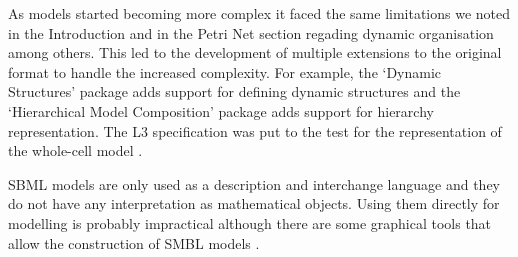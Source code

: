 As models started becoming more complex it faced the same limitations we noted
in the Introduction and in the Petri Net section regading dynamic organisation
among others. This led to the development of multiple extensions to the original
format \citep[SBML L3;][]{sbmlL3} to handle the increased complexity. For
example, the `Dynamic Structures' package adds support for defining dynamic
structures and the `Hierarchical Model Composition' package adds support for
hierarchy representation. The L3 specification was put to the test for the
representation of the \citet{karr_whole-cell_2012} whole-cell model
\citep{waltemath_toward_2016}.

SBML models are only used as a description and interchange language and they do
not have any interpretation as mathematical objects. Using them directly for
modelling is probably impractical although there are some graphical tools that
allow the construction of SMBL models \citep{hoops_copasicomplex_2006}.







